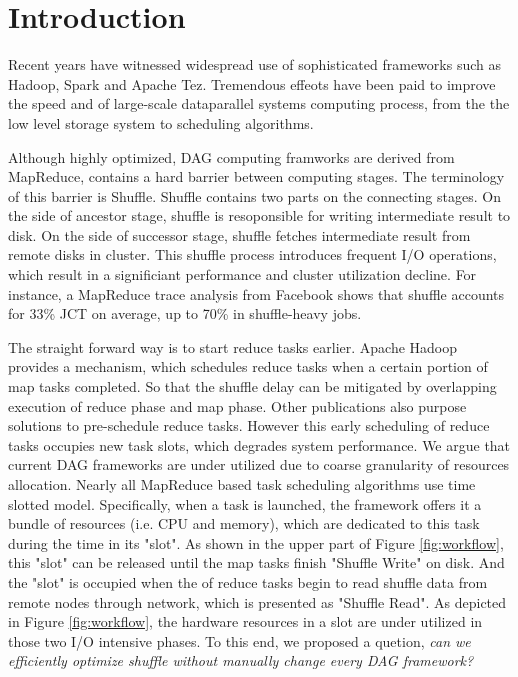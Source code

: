 \section{Introduction}

Recent years have witnessed widespread use of sophisticated frameworks such as Hadoop\cite{hadoop}, Spark\cite{spark} and Apache Tez\cite{tez}.
Tremendous effeots have been paid to improve the speed and of large-scale dataparallel systems computing process, from the the low level storage system to scheduling algorithms.

Although highly optimized, DAG computing framworks are derived from MapReduce\cite{mapreduce}, contains a hard barrier between computing stages. The terminology of this barrier is Shuffle. Shuffle contains two parts on the connecting stages. On the side of ancestor stage, shuffle is resoponsible for writing intermediate result to disk. On the side of successor stage, shuffle fetches intermediate result from remote disks in cluster. This shuffle process introduces frequent I/O operations,
 which result in a significiant performance and cluster utilization decline. For instance, a MapReduce trace analysis from Facebook shows that shuffle accounts for 33\% JCT on average, up to 70\% in shuffle-heavy jobs\cite{manage}.


The straight forward way is to start reduce tasks earlier. Apache Hadoop\cite{hadoop} provides a mechanism, which schedules reduce tasks when a certain portion of map tasks completed. So that the shuffle delay can be mitigated by overlapping execution of reduce phase and map phase. Other publications also purpose solutions to pre-schedule reduce tasks\cite{ihadoop, ishuffle, dynmr}. However this early scheduling of reduce tasks occupies new task slots, which degrades system performance. We argue that current DAG frameworks are under utilized due to coarse granularity of resources allocation. Nearly all
MapReduce based task scheduling algorithms use time slotted model. Specifically, when a task is launched, the framework offers it a bundle of resources (i.e. CPU and memory), which are dedicated to this task during the time in its "slot". As shown in the upper part of Figure \ref{fig:workflow}, this "slot" can be released until the map tasks finish "Shuffle Write" on disk. And the "slot" is occupied when the of reduce tasks begin to read shuffle data from remote nodes through network, which is presented as "Shuffle Read". As depicted in Figure \ref{fig:workflow}, the hardware resources in a slot are under utilized in those two I/O intensive phases. To this end, we proposed a quetion, \textit{can we efficiently optimize shuffle without manually change every DAG framework?} 

